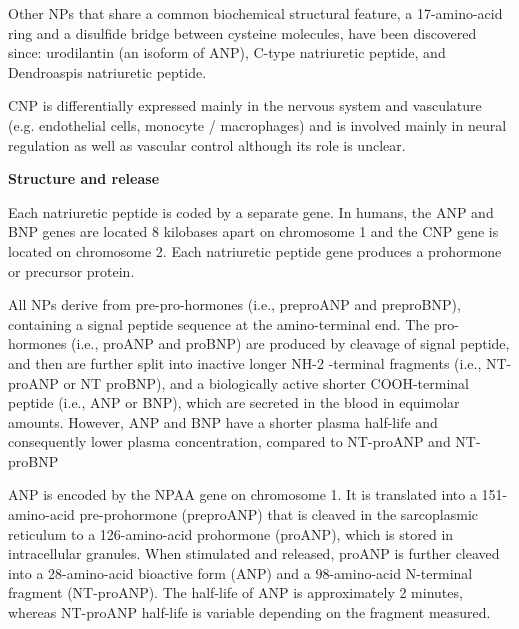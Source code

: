 \documentclass[14pt,a4paper,onecolumn]{extarticle}
\begin{document}
Other NPs that share a common biochemical structural feature, a 17-amino-acid ring and a disulfide bridge between cysteine molecules, have been discovered since: urodilantin (an isoform of ANP), C-type natriuretic peptide, and Dendroaspis natriuretic peptide. \citep{Gaggin2014} %

CNP is differentially expressed mainly in the nervous system and vasculature (e.g. endothelial cells, monocyte / macrophages) and is involved mainly in neural regulation as well as vascular control although its role is unclear. \citep{Suzuki2001} %


\textbf{Structure and release}

Each natriuretic peptide is coded by a separate gene. In humans, the ANP and BNP genes are located 8 kilobases apart on chromosome 1 and the CNP gene is located on chromosome 2. Each natriuretic peptide gene produces a prohormone or precursor protein. \citep{Suzuki2001} %

All NPs derive from pre-pro-hormones (i.e., preproANP and preproBNP), containing a signal peptide sequence at the amino-terminal end. The pro-hormones (i.e., proANP and proBNP) are produced by cleavage of signal peptide, and then are further split into inactive longer NH-2 -terminal fragments (i.e., NT-proANP or NT proBNP), and a biologically active shorter COOH-terminal peptide (i.e., ANP or BNP), which are secreted in the blood in equimolar amounts. However, ANP and BNP have a shorter plasma half-life and consequently lower plasma concentration, compared to NT-proANP and NT-proBNP \citep{bib35} \citep{bib36} \citep{bib37}

ANP is encoded by the NPAA gene on chromosome 1. It is translated into a 151-amino-acid pre-prohormone (preproANP) that is cleaved in the sarcoplasmic reticulum to a 126-amino-acid prohormone (proANP), which is stored in intracellular granules.  When stimulated and released, proANP is further cleaved into a 28-amino-acid bioactive form (ANP) and a 98-amino-acid N-terminal fragment (NT-proANP). The half-life of ANP is approximately 2 minutes, whereas NT-proANP half-life is variable depending on the fragment measured. \citep{Volpe2016} %
\end{document}

